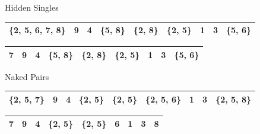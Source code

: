 \documentclass{beamer}
\begin{document}
\begin{frame}{Hidden Singles}
\begin{table}[htbp]

    \begin{center}
        \begin{tabular}{|c|c|c|c|c|c|c|c|c|}
        \hline
        \cellcolor[gray]{0.7}\{2, 5, 6, 7, 8\} & 9 & 4 & \{5, 8\} & \{2, 8\} & \{2, 5\} & 1 & 3 & \{5, 6\}\\
        \hline
        \end{tabular}
    \end{center}
\end{table}
\begin{table}
    \begin{center}

        \begin{tabular}{|c|c|c|c|c|c|c|c|c|}
        \hline
        \cellcolor[gray]{0.7}7 & 9 & 4 & \{5, 8\} & \{2, 8\} & \{2, 5\} & 1 & 3 & \{5, 6\}\\
        \hline
        \end{tabular}
    \end{center}
\end{table}
\end{frame}

\begin{frame}{Naked Pairs}

\begin{table}[htbp]

    \begin{center}

        \begin{tabular}{|c|c|c|c|c|c|c|c|c|}
        \hline
        \{2, 5, 7\} & 9 & 4 & \cellcolor[gray]{0.7}\{2, 5\} & \cellcolor[gray]{0.7}\{2, 5\} & \{2, 5, 6\} & 1 & 3 & \{2, 5, 8\}\\
        \hline
        \end{tabular}
    \end{center}
\end{table}

\begin{table}[htbp]

    \begin{center}

        \begin{tabular}{|c|c|c|c|c|c|c|c|c|}
        \hline
        \cellcolor[gray]{0.7}7 & 9 & 4 & \{2, 5\} & \{2, 5\} & \cellcolor[gray]{0.7} 6 & 1 & 3 & \cellcolor[gray]{0.7} 8\\
        \hline
        \end{tabular}
    \end{center}
\end{table}
\end{frame}
\end{document}
